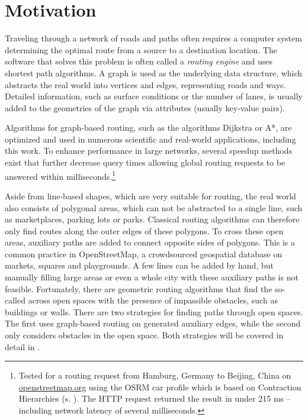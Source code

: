 
\section{Motivation}

	Traveling through a network of roads and paths often requires a computer system determining the optimal route from a source to a destination location.
	The software that solves this problem is often called a \emph{routing engine} and uses shortest path algorithms.
	A graph is used as the underlying data structure, which abstracts the real world into vertices and edges, representing roads and ways.
	Detailed information, such as surface conditions or the number of lanes, is usually added to the geometries of the graph via attributes (usually key-value pairs).
	
	Algorithms for graph-based routing, such as the algorithms Dijkstra or A*, are optimized and used in numerous scientific and real-world applications, including this work.
	To enhance performance in large networks, several speedup methods exist that further decrease query times allowing global routing requests to be answered within milliseconds.\footnote{Tested for a routing request from Hamburg, Germany to Beijing, China on \href{https://www.openstreetmap.org/directions?engine=fossgis\_osrm\_car&route=53.55\%2C10.00\%3B39.91\%2C116.39}{openstreetmap.org} using the OSRM car profile which is based on Contraction Hierarchies (s. ). The HTTP request returned the result in under 215 ms -- including network latency of several milliseconds.}
	
	Aside from line-based shapes, which are very suitable for routing, the real world also consists of polygonal areas, which can not be abstracted to a single line, such as marketplaces, parking lots or parks.
	Classical routing algorithms can therefore only find routes along the outer edges of these polygons.
	To cross these open areas, auxiliary paths are added to connect opposite sides of polygons.
	This is a common practice in OpenStreetMap, a crowdsourced geospatial database on markets, squares and playgrounds.
	A few lines can be added by hand, but manually filling large areas or even a whole city with these auxiliary paths is not feasible.
	Fortunately, there are geometric routing algorithms that find the so-called  across open spaces with the presence of impassible obstacles, such as buildings or walls.
	There are two strategies for finding paths through open spaces. The first uses graph-based routing on generated auxiliary edges, while the second only considers obstacles in the open space.
	Both strategies will be covered in detail in .
	
